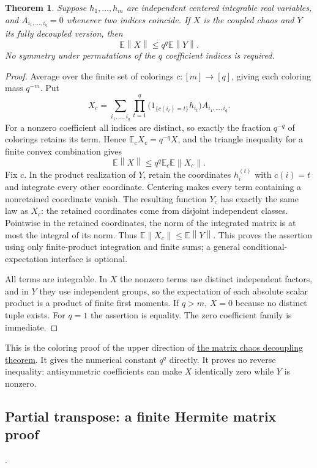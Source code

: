 \documentclass[11pt,a4paper]{article}
\newcommand{\norm}[1]{\left\lVert#1\right\rVert}
\DeclareRobustCommand{\code}[1]{{\footnotesize\urlstyle{tt}\nolinkurl{#1}}}
\newtheorem{theorem}{Theorem}[section]
\begin{document}
\begin{theorem}
Suppose $h_1,\ldots,h_m$ are independent centered integrable real variables,
and $A_{i_1,\ldots,i_q}=0$ whenever two indices coincide.  If $X$ is the
coupled chaos and $Y$ its fully decoupled version, then
\[
                     \mathbb E\norm X\leq q^q\mathbb E\norm Y.
\]
No symmetry under permutations of the $q$ coefficient indices is required.
\end{theorem}
\begin{proof}
Average over the finite set of colorings $c:[m]\to[q]$, giving each
coloring mass $q^{-m}$.  Put
\[
 X_c=\sum_{i_1,\ldots,i_q}
       \prod_{t=1}^q\bigl(1_{\{c(i_t)=t\}}h_{i_t}\bigr)
       A_{i_1,\ldots,i_q}.
\]
For a nonzero coefficient all indices are distinct, so exactly the
fraction $q^{-q}$ of colorings retains its term.  Hence
$\mathbb E_c X_c=q^{-q}X$, and the triangle inequality for a finite
convex combination gives
\[
 \mathbb E\norm X\leq q^q\mathbb E_c\mathbb E\norm{X_c}.
\]
Fix $c$.  In the product realization of $Y$, retain the coordinates
$h_i^{(t)}$ with $c(i)=t$ and integrate every other coordinate.  Centering
makes every term containing a nonretained coordinate vanish.  The
resulting function $Y_c$ has exactly the same law as $X_c$: the retained
coordinates come from disjoint independent classes.  Pointwise in the
retained coordinates, the norm of the integrated matrix is at most the
integral of its norm.  Thus $\mathbb E\norm{X_c}\leq\mathbb E\norm Y$.
This proves the assertion using only finite-product integration and
finite sums; a general conditional-expectation interface is optional.

All terms are integrable.  In $X$ the nonzero terms use distinct
independent factors, and in $Y$ they use independent groups, so the
expectation of each absolute scalar product is a product of finite first
moments.  If $q>m$, $X=0$ because no distinct tuple exists.  For $q=1$
the assertion is equality.  The zero coefficient family is immediate.
\end{proof}

This is the coloring proof of the upper direction of
\href{https://arxiv.org/html/2412.18468v2}{the matrix chaos decoupling theorem}.
It gives the numerical constant $q^q$ directly.  It proves no reverse
inequality: antisymmetric coefficients can make $X$ identically zero
while $Y$ is nonzero.

\subsection{Partial transpose: a finite Hermite matrix proof}
\label{route:gaussian-series-partial-transpose-norm}
\noindent\code{gaussian-series-partial-transpose-norm}.
\end{document}
